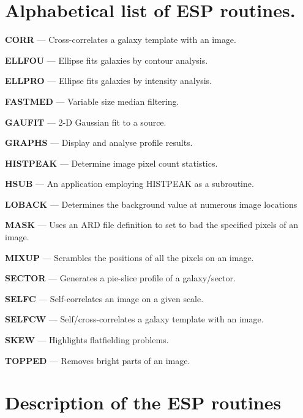 \documentclass[twoside,11pt]{article}
\newcommand{\xlabel}[1]{}
\begin{document}
\newpage
\appendix

\newpage

\section{Alphabetical list of ESP routines.}
\xlabel{ALPHABETICAL}
\label{app:alphabetical}

%
%
{\bf CORR}{ --- Cross-correlates a galaxy template with an image.}
\pageref{des:corr}

{\bf ELLFOU}{ --- Ellipse fits galaxies by contour analysis.}
\pageref{des:ellfou}

{\bf ELLPRO}{ --- Ellipse fits galaxies by intensity analysis.}
\pageref{des:ellpro}

{\bf FASTMED}{ --- Variable size median filtering.}
\pageref{des:fast}

{\bf GAUFIT}{ --- 2-D Gaussian fit to a source.}
\pageref{des:gaufit}

{\bf GRAPHS}{ --- Display and analyse profile results.}
\pageref{des:graphs}

{\bf HISTPEAK}{ --- Determine image pixel count statistics.}
\pageref{des:histpeak}

{\bf HSUB}{ --- An application employing HISTPEAK as a subroutine.}
\pageref{des:hsub}

{\bf LOBACK}{ --- Determines the background value at numerous image locations}
\pageref{des:loback}

{\bf MASK}{ --- Uses an ARD file definition to set to bad the specified pixels
of an image.}
\pageref{des:mask}

{\bf MIXUP}{ --- Scrambles the positions of all the pixels on an image.}
\pageref{des:mixup}

{\bf SECTOR}{ --- Generates a pie-slice profile of a galaxy/sector.}
\pageref{des:sector}

{\bf SELFC}{ --- Self-correlates an image on a given scale.}
\pageref{des:selfc}

{\bf SELFCW}{ --- Self/cross-correlates a galaxy template with an image.}
\pageref{des:selfcw}

{\bf SKEW}{ --- Highlights flatfielding problems.}
\pageref{des:skew}

{\bf TOPPED}{ --- Removes bright parts of an image.}
\pageref{des:topped}

\newpage
\section{Description of the ESP routines}
\label{app:description}
\end{document}

